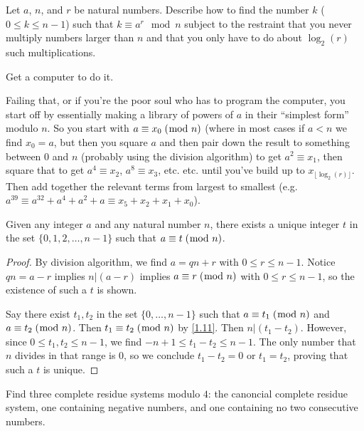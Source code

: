 \documentclass[../main.tex]{subfiles}
\begin{document}
\begin{ques} \label{3.6}
  Let $a$, $n$, and $r$ be natural numbers. Describe how to find the number $k$ ($0 \leq k \leq n-1$) such that $k \equiv a^{r} \mod n$ subject to the restraint that you never multiply numbers larger than $n$ and that you only have to do about $\log_2 (r)$ such multiplications.
\end{ques}

Get a computer to do it.

Failing that, or if you're the poor soul who has to program the computer, you start off by essentially making a library of powers of $a$ in their ``simplest form'' modulo $n$. So you start with $a \equiv x_0 \; (\bmod \; n)$ (where in most cases if $a < n$ we find $x_0 = a$, but then you square $a$ and then pair down the result to something between $0$ and $n$ (probably using the division algorithm) to get $a^2 \equiv x_1$, then square that to get $a^4 \equiv x_2$, $a^8 \equiv x_3$, etc. etc. until you've build up to $x_{\lfloor \log_2 (r) \rfloor}$. Then add together the relevant terms from largest to smallest (e.g. $a^{39} \equiv a^{32} + a^4 + a^2 + a \equiv x_5 + x_2 + x_1 + x_0$).



\setcounter{thm}{13}

\begin{thm} \label{3.14}
  Given any integer $a$ and any natural number $n$, there exists a unique integer $t$ in the set $\{0, 1, 2, \ldots, n-1\}$ such that $a \equiv t \; (\bmod \; n)$.
\end{thm}

\begin{proof}
  By division algorithm, we find $a = qn + r$ with $0 \leq r \leq n-1$. Notice $qn = a-r$ implies $n | (a-r)$ implies $a \equiv r \; (\bmod \; n)$ with $0 \leq r \leq n-1$, so the existence of such a $t$ is shown.

  Say there exist $t_1,t_2$ in the set $\{0,\ldots,n-1\}$ such that $a \equiv t_1 \; (\bmod \; n)$ and $a \equiv t_2 \; (\bmod \; n)$. Then $t_1 \equiv t_2 \; (\bmod \; n)$ by \ref{1.11}. Then $n | (t_1 - t_2)$.
  However, since $0 \leq t_1, t_2 \leq n-1$, we find $-n+1 \leq t_1 - t_2 \leq n-1$. The only number that $n$ divides in that range is $0$, so we conclude $t_1 - t_2 = 0$ or $t_1 = t_2$, proving that such a $t$ is unique.
\end{proof}



\begin{ex} \label{3.15}
  Find three complete residue systems modulo $4$: the canoncial complete residue system, one containing negative numbers, and one containing no two consecutive numbers.
\end{ex}
\end{document}
